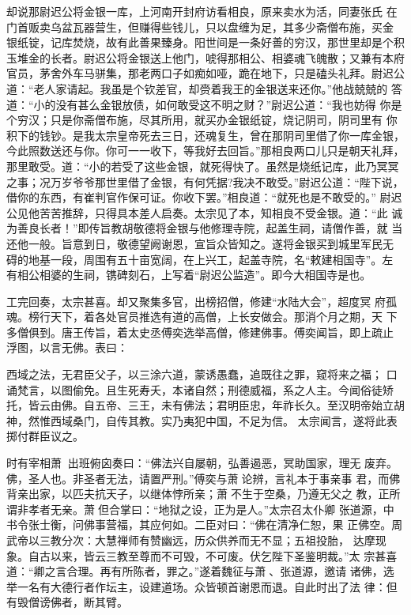 却说那尉迟公将金银一库，上河南开封府访看相良，原来卖水为活，同妻张氏
在门首贩卖乌盆瓦器营生，但赚得些钱儿，只以盘缠为足，其多少斋僧布施，买金
银纸锭，记库焚烧，故有此善果臻身。阳世间是一条好善的穷汉，那世里却是个积
玉堆金的长者。尉迟公将金银送上他门，唬得那相公、相婆魂飞魄散；又兼有本府
官员，茅舍外车马骈集，那老两口子如痴如哑，跪在地下，只是磕头礼拜。尉迟公
道：“老人家请起。我虽是个钦差官，却赍着我王的金银送来还你。”他战兢兢的
答道：“小的没有甚么金银放债，如何敢受这不明之财？”尉迟公道：“我也妨得
你是个穷汉；只是你斋僧布施，尽其所用，就买办金银纸锭，烧记阴司，阴司里有
你积下的钱钞。是我太宗皇帝死去三日，还魂复生，曾在那阴司里借了你一库金银，
今此照数送还与你。你可一一收下，等我好去回旨。”那相良两口儿只是朝天礼拜，
那里敢受。道：“小的若受了这些金银，就死得快了。虽然是烧纸记库，此乃冥冥
之事；况万岁爷爷那世里借了金银，有何凭据?我决不敢受。”尉迟公道：“陛下说，
借你的东西，有崔判官作保可证。你收下罢。”相良道：“就死也是不敢受的。”
尉迟公见他苦苦推辞，只得具本差人启奏。太宗见了本，知相良不受金银。道：“此
诚为善良长者！”即传旨教胡敬德将金银与他修理寺院，起盖生祠，请僧作善，就
当还他一般。旨意到日，敬德望阙谢恩，宣旨众皆知之。遂将金银买到城里军民无
碍的地基一段，周围有五十亩宽阔，在上兴工，起盖寺院，名“敕建相国寺”。左
有相公相婆的生祠，镌碑刻石，上写着“尉迟公监造”。即今大相国寺是也。

工完回奏，太宗甚喜。却又聚集多官，出榜招僧，修建“水陆大会”，超度冥
府孤魂。榜行天下，着各处官员推选有道的高僧，上长安做会。那消个月之期，天
下多僧俱到。唐王传旨，着太史丞傅奕选举高僧，修建佛事。傅奕闻旨，即上疏止
浮图，以言无佛。表曰：

西域之法，无君臣父子，以三涂六道，蒙诱愚蠢，追既往之罪，窥将来之福；
口诵梵言，以图偷免。且生死寿夭，本诸自然；刑德威福，系之人主。今闻俗徒矫
托，皆云由佛。自五帝、三王，未有佛法；君明臣忠，年祚长久。至汉明帝始立胡
神，然惟西域桑门，自传其教。实乃夷犯中国，不足为信。
太宗闻言，遂将此表掷付群臣议之。

时有宰相萧，出班俯囟奏曰：“佛法兴自屡朝，弘善遏恶，冥助国家，理无
废弃。佛，圣人也。非圣者无法，请置严刑。”傅奕与萧论辨，言礼本于事亲事
君，而佛背亲出家，以匹夫抗天子，以继体悖所亲；萧不生于空桑，乃遵无父之
教，正所谓非孝者无亲。萧但合掌曰：“地狱之设，正为是人。”太宗召太仆卿
张道源，中书令张士衡，问佛事营福，其应何如。二臣对曰：“佛在清净仁恕，果
正佛空。周武帝以三教分次：大慧禅师有赞幽远，历众供养而无不显；五祖投胎，
达摩现象。自古以来，皆云三教至尊而不可毁，不可废。伏乞陛下圣鉴明裁。”太
宗甚喜道：“卿之言合理。再有所陈者，罪之。”遂着魏征与萧、张道源，邀请
诸佛，选举一名有大德行者作坛主，设建道场。众皆顿首谢恩而退。自此时出了法
律：但有毁僧谤佛者，断其臂。

